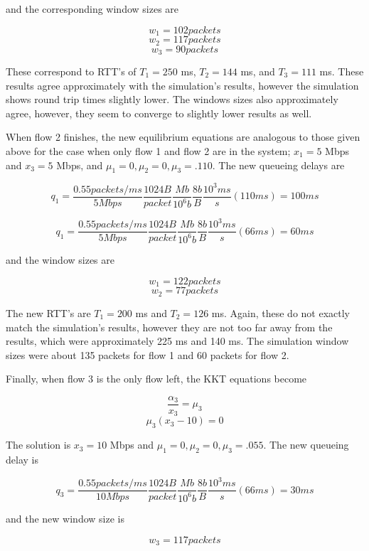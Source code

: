 \documentclass{article}
\begin{document}
and the corresponding window sizes are

$$w_1 = 102 packets$$
$$w_2 = 117 packets$$
$$w_3 = 90 packets $$

These correspond to RTT's of $T_1 = 250$ ms, $T_2 = 144$ ms, and $T_3 = 111$ ms. These results agree approximately with the simulation's results, however the simulation shows round trip times slightly lower. The windows sizes also approximately agree, however, they seem to converge to slightly lower results as well.

When flow 2 finishes, the new equilibrium equations are analogous to those given above for the case when only flow 1 and flow 2 are in the system; $x_1 = 5$ Mbps and $x_3 = 5$ Mbps, and $\mu_1 = 0, \mu_2 = 0, \mu_3 = .110$. The new queueing delays are 

$$q_1 = \frac{0.55 packets/ms}{5 Mbps} \frac{1024 B}{packet} \frac{Mb}{10^6 b} \frac{8 b}{B} \frac{10^3 ms}{s} (110 ms) = 100 ms$$

$$q_1 = \frac{0.55 packets/ms}{5 Mbps} \frac{1024 B}{packet} \frac{Mb}{10^6 b} \frac{8 b}{B} \frac{10^3 ms}{s} (66 ms) = 60 ms$$

and the window sizes are

$$w_1 = 122 packets$$
$$w_2 = 77 packets$$

The new RTT's are $T_1 = 200$ ms and $T_2 = 126$ ms. Again, these do not exactly match the simulation's results, however they are not too far away from the results, which were approximately 225 ms and 140 ms. The simulation window sizes were about 135 packets for flow 1 and 60 packets for flow 2.

Finally, when flow 3 is the only flow left, the KKT equations become

$$\frac{\alpha_3}{x_3}=\mu_3$$
$$\mu_3 (x_3 - 10) = 0$$

The solution is $x_3 = 10$ Mbps and $\mu_1 = 0, \mu_2 = 0, \mu_3 = .055$. The new queueing delay is 

$$q_3 = \frac{0.55 packets/ms}{10 Mbps} \frac{1024 B}{packet} \frac{Mb}{10^6 b} \frac{8 b}{B}  \frac{10^3 ms}{s} (66 ms) = 30 ms$$

and the new window size is

$$w_3 = 117 packets$$
\end{document}
